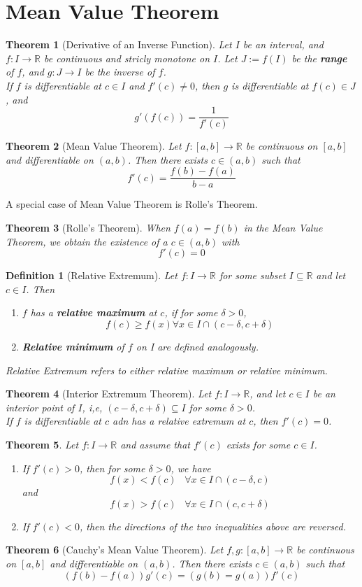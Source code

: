 \documentclass[12pt]{article}
\newtheorem{definition}{Definition}[section]
\newtheorem{theorem}{Theorem}[section]
\theoremstyle{definition}
\begin{document}
\section{Mean Value Theorem}
\begin{theorem}[Derivative of an Inverse Function]
\normalfont Let $I$ be an interval, and $f:I\to\mathbb{R}$ be continuous and stricly monotone on $I$. Let $J:=f(I)$ be the \textbf{range} of $f$, and $g:J\to I$ be the inverse of $f$.\\
If $f$ is differentiable at $c\in I$ and $f'(c)\neq 0$, then $g$ is differentiable at $f(c)\in J$, and
\[
g'(f(c)) = \frac{1}{f'(c)}
\]
\end{theorem}
\begin{theorem}[Mean Value Theorem]
\normalfont Let $f:[a,b]\to\mathbb{R}$ be continuous on $[a,b]$ and differentiable on $(a,b)$. Then there exists $c\in (a,b)$ such that
\[
f'(c)=\frac{f(b)-f(a)}{b-a}
\]
\end{theorem}
A special case of Mean Value Theorem is Rolle's Theorem. 
\begin{theorem}[Rolle's Theorem]
\normalfont When $f(a)=f(b)$ in the Mean Value Theorem, we obtain the existence of a $c\in(a,b)$ with
\[
f'(c)=0
\]
\end{theorem}
\begin{definition}[Relative Extremum]
\normalfont Let $f:I\to \mathbb{R}$ for some subset $I\subseteq \mathbb{R}$ and let $c\in I$. Then
\begin{enumerate}
	\item $f$ has a \textbf{relative maximum} at $c$, if for some $\delta>0$,
	\[
f(c)\geq f(x)\forall x\in I\cap (c-\delta, c+\delta)
	\]
	\item \textbf{Relative minimum} of $f$ on I are defined analogously.
\end{enumerate}
Relative Extremum refers to either relative maximum or relative minimum.
\end{definition}
\begin{theorem}[Interior Extremum Theorem]
\normalfont Let $f:I\to\mathbb{R}$, and let $c\in I$ be an interior point of $I$, i,e, $(c-\delta, c+\delta)\subseteq I$ for some $\delta>0$.\\
If $f$ is differentiable at $c$ adn has a relative extremum at $c$, then $f'(c)=0$.
\end{theorem}
\begin{theorem}
\normalfont Let $f:I\to\mathbb{R}$ and assume that $f'(c)$ exists for some $c\in I$.
\begin{enumerate}
	\item If $f'(c)>0$, then for some $\delta>0$, we have
	\[
f(x)<f(c)\;\;\;\forall x\in I\cap(c-\delta,c)
	\]
	and
	\[
f(x)>f(c)\;\;\;\forall x\in I\cap(c,c+\delta)
	\]
	\item If $f'(c)<0$, then the directions of the two inequalities above are reversed.
\end{enumerate}
\end{theorem}
\begin{theorem}[Cauchy's Mean Value Theorem]
\normalfont Let $f,g:[a,b]\to\mathbb{R}$ be continuous on $[a,b]$ and differentiable on $(a,b)$. Then there exists $c\in(a,b)$ such that
\[
(f(b)-f(a))g'(c)=(g(b)=g(a))f'(c)
\]
\end{theorem}
\end{document}
